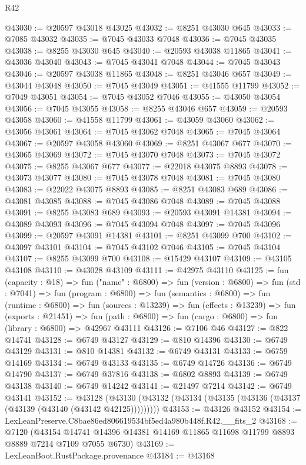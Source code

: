 \begin{lexlean}{R42}
\begin{coremodule}
{@43030 := @20597 @43018 @43025
@43032 := @8251 @43030 @645
@43033 := @7085 @43032
@43035 := @7045 @43033 @7048
@43036 := @7045 @43035
@43038 := @8255 @43030 @645
@43040 := @20593 @43038 @11865
@43041 := @43036 @43040
@43043 := @7045 @43041 @7048
@43044 := @7045 @43043
@43046 := @20597 @43038 @11865
@43048 := @8251 @43046 @657
@43049 := @43044 @43048
@43050 := @7045 @43049
@43051 := @41555 @11799
@43052 := @7049 @43051
@43054 := @7045 @43052 @7046
@43055 := @43050 @43054
@43056 := @7045 @43055
@43058 := @8255 @43046 @657
@43059 := @20593 @43058
@43060 := @41558 @11799
@43061 := @43059 @43060
@43062 := @43056 @43061
@43064 := @7045 @43062 @7048
@43065 := @7045 @43064
@43067 := @20597 @43058 @43060
@43069 := @8251 @43067 @677
@43070 := @43065 @43069
@43072 := @7045 @43070 @7048
@43073 := @7045 @43072
@43075 := @8255 @43067 @677
@43077 := @22018 @43075 @8893
@43078 := @43073 @43077
@43080 := @7045 @43078 @7048
@43081 := @7045 @43080
@43083 := @22022 @43075 @8893
@43085 := @8251 @43083 @689
@43086 := @43081 @43085
@43088 := @7045 @43086 @7048
@43089 := @7045 @43088
@43091 := @8255 @43083 @689
@43093 := @20593 @43091 @14381
@43094 := @43089 @43093
@43096 := @7045 @43094 @7048
@43097 := @7045 @43096
@43099 := @20597 @43091 @14381
@43101 := @8251 @43099 @700
@43102 := @43097 @43101
@43104 := @7045 @43102 @7046
@43105 := @7045 @43104
@43107 := @8255 @43099 @700
@43108 := @15429 @43107
@43109 := @43105 @43108
@43110 := @43028 @43109
@43111 := @42975 @43110
@43125 := fun (capacity : @18) =>
  fun ("name" : @6800) =>
  fun (version : @6800) =>
  fun (std : @7041) =>
  fun (program : @6800) =>
  fun (semantics : @6800) =>
  fun (runtime : @6800) =>
  fun (sources : @13239) =>
  fun (effects : @13239) =>
  fun (exports : @21451) =>
  fun (path : @6800) => fun (cargo : @6800) => fun (library : @6800) => @42967 @43111
@43126 := @7106 @46
@43127 := @822 @14741
@43128 := @6749 @43127
@43129 := @810 @14396
@43130 := @6749 @43129
@43131 := @810 @14381
@43132 := @6749 @43131
@43133 := @6759 @14169
@43134 := @6749 @43133
@43135 := @6749 @14726
@43136 := @6749 @14790
@43137 := @6749 @37816
@43138 := @6802 @8893
@43139 := @6749 @43138
@43140 := @6749 @14242
@43141 := @21497 @7214
@43142 := @6749 @43141
@43152 := @43128
    (@43130 (@43132 (@43134 (@43135 (@43136 (@43137 (@43139 (@43140 (@43142 @42125)))))))))
@43153 := @43126 @43152
@43154 := LexLeanPreserve.C8bae86ed806619534bf5ed4a980b448f.R42.__fits_2
@43168 := @7120
    (@43154 @14741 @14396 @14381 @14169 @11865 @11698 @11799 @8893 @8889 @7214 @7109 @7055 @6730)
@43169 := LexLeanBoot.RustPackage.provenance
@43184 := @43168
}
\end{coremodule}
\end{lexlean}
